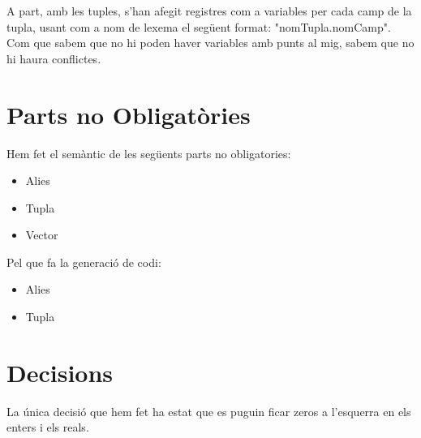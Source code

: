 \documentclass[11pt,a4paper,twoside]{article}
\begin{document}
  A part, amb les tuples, s'han afegit registres com a variables per cada camp de la tupla, usant com a nom de lexema el següent format: "nomTupla.nomCamp". Com que sabem que no hi poden haver variables amb punts al mig, sabem que no hi haura conflictes.

\section{Parts no Obligatòries}

Hem fet el semàntic de les següents parts no obligatories:
\begin{itemize}
  \item Alies
  \item Tupla
  \item Vector
\end{itemize}

Pel que fa la generació de codi:

\begin{itemize}
  \item Alies
  \item Tupla
\end{itemize}

\section{Decisions}

La única decisió que hem fet ha estat que es puguin ficar zeros a l'esquerra en els enters i els reals.
\end{document}
